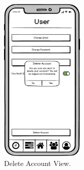 \begin{figure}[H]
    \centering
    \includegraphics[width=4cm]{./graphics/design/User Account (Delete Account).png}
    \caption{Delete Account View.}
    \label{fig:delete_account}
\end{figure}